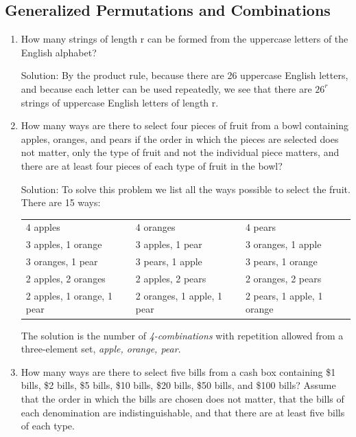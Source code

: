\documentclass[11pt,a4paper]{book}
\begin{document}
\subsection{Generalized Permutations and Combinations}
\begin{enumerate}[label=Example~\arabic*]
\item How many strings of length r can be formed from the uppercase letters of the English alphabet?

Solution: By the product rule, because there are 26 uppercase English letters, and because each letter can be used repeatedly, we see that there are $26^{r}$ strings of uppercase English letters of length r.

\item How many ways are there to select four pieces of fruit from a bowl containing apples, oranges, and pears if the order in which the pieces are selected does not matter, only the type of fruit and not the individual piece matters, and there are at least four pieces of each type of fruit in the bowl?

Solution: To solve this problem we list all the ways possible to select the fruit.
There are 15 ways:

\begin{table}[h]
\centering
\begin{tabular}{ l l l }
4 apples & 4 oranges& 4 pears\\
3 apples, 1 orange & 3 apples, 1 pear & 3 oranges, 1 apple\\
3 oranges, 1 pear & 3 pears, 1 apple & 3 pears, 1 orange\\
2 apples, 2 oranges & 2 apples, 2 pears & 2 oranges, 2 pears\\
2 apples, 1 orange, 1 pear & 2 oranges, 1 apple, 1 pear & 2 pears, 1 apple, 1 orange\\
\end{tabular}
\label{tab:exe}
\end{table}
The solution is the number of \emph{4-combinations} with repetition allowed from a three-element set, \emph{{apple, orange, pear}}.

\item How many ways are there to select five bills from a cash box containing \$1 bills, \$2 bills, \$5 bills, \$10 bills, \$20 bills, \$50 bills, and \$100 bills?
Assume that the order in which the bills are chosen does not matter, that the bills of each denomination are indistinguishable, and that there are at least five bills of each type.


\end{enumerate}
\end{document}
